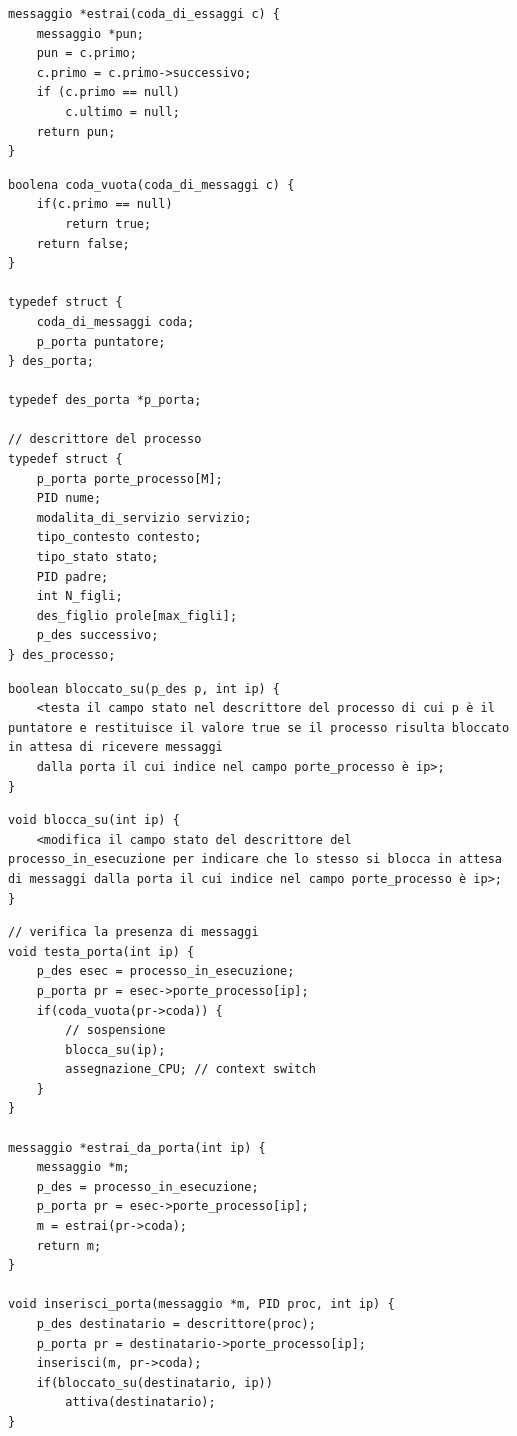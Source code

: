 \documentclass{article}
\begin{document}
\begin{lstlisting}
messaggio *estrai(coda_di_essaggi c) {
    messaggio *pun;
    pun = c.primo;
    c.primo = c.primo->successivo;
    if (c.primo == null)
        c.ultimo = null;
    return pun;
}
\end{lstlisting}

\begin{lstlisting}
boolena coda_vuota(coda_di_messaggi c) {
    if(c.primo == null)
        return true;
    return false;
}

typedef struct {
    coda_di_messaggi coda;
    p_porta puntatore;
} des_porta;

typedef des_porta *p_porta;

// descrittore del processo
typedef struct {
    p_porta porte_processo[M];
    PID nume;
    modalita_di_servizio servizio;
    tipo_contesto contesto;
    tipo_stato stato;
    PID padre;
    int N_figli;
    des_figlio prole[max_figli];
    p_des successivo;
} des_processo;
\end{lstlisting}

\begin{lstlisting}
boolean bloccato_su(p_des p, int ip) {
    <testa il campo stato nel descrittore del processo di cui p è il puntatore e restituisce il valore true se il processo risulta bloccato in attesa di ricevere messaggi
    dalla porta il cui indice nel campo porte_processo è ip>;
}
\end{lstlisting}

\begin{lstlisting}
void blocca_su(int ip) {
    <modifica il campo stato del descrittore del processo_in_esecuzione per indicare che lo stesso si blocca in attesa di messaggi dalla porta il cui indice nel campo porte_processo è ip>;
}
\end{lstlisting}

\begin{lstlisting}
// verifica la presenza di messaggi
void testa_porta(int ip) {
    p_des esec = processo_in_esecuzione;
    p_porta pr = esec->porte_processo[ip];
    if(coda_vuota(pr->coda)) {
        // sospensione
        blocca_su(ip);
        assegnazione_CPU; // context switch
    }
}

messaggio *estrai_da_porta(int ip) {
    messaggio *m;
    p_des = processo_in_esecuzione;
    p_porta pr = esec->porte_processo[ip];
    m = estrai(pr->coda);
    return m;
}

void inserisci_porta(messaggio *m, PID proc, int ip) {
    p_des destinatario = descrittore(proc);
    p_porta pr = destinatario->porte_processo[ip];
    inserisci(m, pr->coda);
    if(bloccato_su(destinatario, ip))
        attiva(destinatario);
}
\end{lstlisting}
\end{document}
